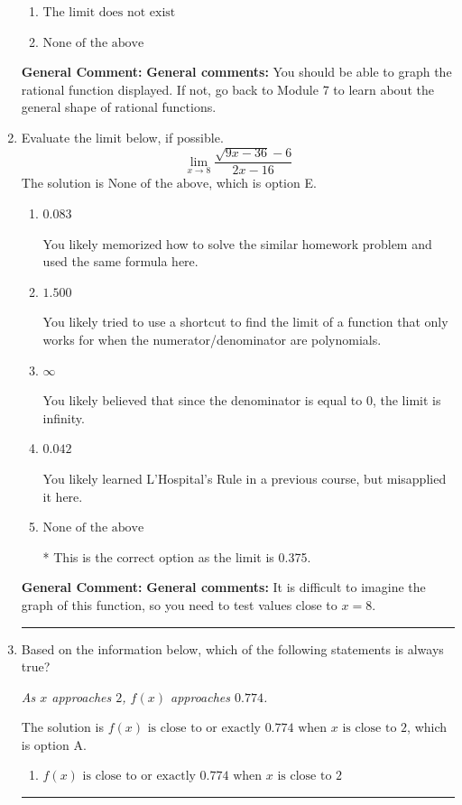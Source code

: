 \documentclass{extbook}[14pt]
\newcommand{\litem}[1]{\item #1

\rule{\textwidth}{0.4pt}}
\begin{document}
\begin{enumerate}
{\begin{enumerate}[label=\Alph*.]
\item \( \text{The limit does not exist} \)


\item \( \text{None of the above} \)


\end{enumerate}

\textbf{General Comment:} \textbf{General comments:} You should be able to graph the rational function displayed. If not, go back to Module 7 to learn about the general shape of rational functions.
}
\litem{
Evaluate the limit below, if possible.
\[ \lim_{x \rightarrow 8} \frac{\sqrt{9x - 36} - 6}{2x - 16} \]The solution is \( \text{None of the above} \), which is option E.\begin{enumerate}[label=\Alph*.]
\item \( 0.083 \)

You likely memorized how to solve the similar homework problem and used the same formula here.
\item \( 1.500 \)

You likely tried to use a shortcut to find the limit of a function that only works for when the numerator/denominator are polynomials.
\item \( \infty \)

You likely believed that since the denominator is equal to 0, the limit is infinity.
\item \( 0.042 \)

You likely learned L'Hospital's Rule in a previous course, but misapplied it here.
\item \( \text{None of the above} \)

* This is the correct option as the limit is 0.375.
\end{enumerate}

\textbf{General Comment:} \textbf{General comments:} It is difficult to imagine the graph of this function, so you need to test values close to $x = 8$.
}
\litem{
Based on the information below, which of the following statements is always true?

\begin{center}
    \textit{ As $x$ approaches $2$, $f(x)$ approaches $0.774$. }
\end{center}
The solution is \( f(x) \text{ is close to or exactly } 0.774 \text{ when } x \text{ is close to } 2 \), which is option A.\begin{enumerate}[label=\Alph*.]
\item \( f(x) \text{ is close to or exactly } 0.774 \text{ when } x \text{ is close to } 2 \)



\end{enumerate}}
\end{enumerate}
\end{document}
